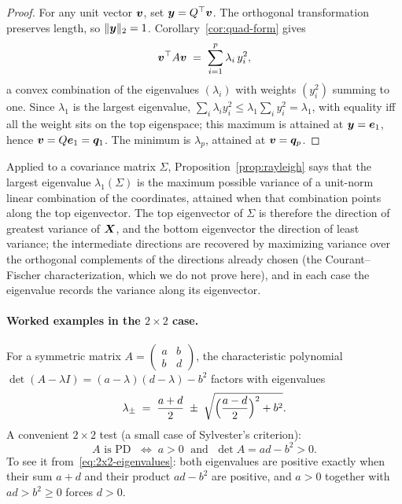 \begin{proof}
For any unit vector \(\bm{v}\), set \(\bm{y} = Q^{\top} \bm{v}\). The orthogonal transformation preserves length, so \(\lVert\bm{y}\rVert_2 = 1\). Corollary~\ref{cor:quad-form} gives
\[
  \bm{v}^{\top} A \bm{v} \;=\; \sum_{i = 1}^p \lambda_i\, y_i^2,
\]
a convex combination of the eigenvalues \((\lambda_i)\) with weights \((y_i^2)\) summing to one. Since \(\lambda_1\) is the largest eigenvalue, \(\sum_i \lambda_i y_i^2 \le \lambda_1 \sum_i y_i^2 = \lambda_1\), with equality iff all the weight sits on the top eigenspace; this maximum is attained at \(\bm{y} = \bm{e}_1\), hence \(\bm{v} = Q \bm{e}_1 = \bm{q}_1\). The minimum is \(\lambda_p\), attained at \(\bm{v} = \bm{q}_p\).
\end{proof}

Applied to a covariance matrix \(\Sigma\), Proposition~\ref{prop:rayleigh} says that the largest eigenvalue \(\lambda_1(\Sigma)\) is the maximum possible variance of a unit-norm linear combination of the coordinates, attained when that combination points along the top eigenvector. The top eigenvector of \(\Sigma\) is therefore the direction of greatest variance of \(\bm{X}\), and the bottom eigenvector the direction of least variance; the intermediate directions are recovered by maximizing variance over the orthogonal complements of the directions already chosen (the Courant--Fischer characterization, which we do not prove here), and in each case the eigenvalue records the variance along its eigenvector.

\paragraph{Worked examples in the \(2 \times 2\) case.}
For a symmetric matrix \(A = \begin{pmatrix} a & b \\ b & d \end{pmatrix}\), the characteristic polynomial \(\det(A - \lambda I) = (a - \lambda)(d - \lambda) - b^2\) factors with eigenvalues
\begin{equation}
  \lambda_{\pm} \;=\; \frac{a + d}{2} \;\pm\; \sqrt{\Bigl(\frac{a - d}{2}\Bigr)^2 + b^2}.
  \label{eq:2x2-eigenvalues}
\end{equation}
A convenient \(2 \times 2\) test (a small case of Sylvester's criterion):
\[
  A \text{ is PD } \;\iff\; a > 0 \;\text{ and }\; \det A = ad - b^2 > 0.
\]
To see it from~\eqref{eq:2x2-eigenvalues}: both eigenvalues are positive exactly when their sum \(a + d\) and their product \(ad - b^2\) are positive, and \(a > 0\) together with \(ad > b^2 \ge 0\) forces \(d > 0\).

